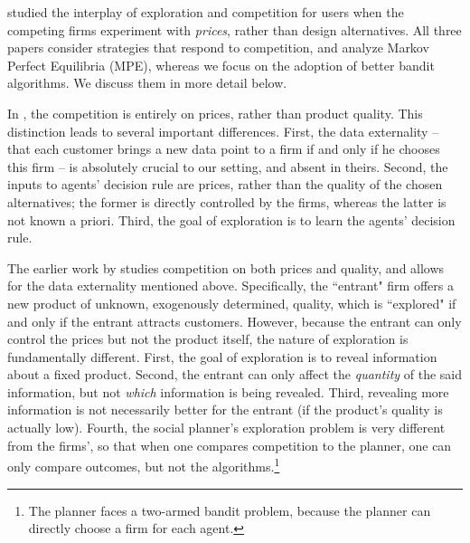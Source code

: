 \citet{bergemann1997market,bergemann2000experimentation,keller2003price} studied the interplay of exploration and competition for users when the competing firms experiment with \emph{prices}, rather than design alternatives. All three papers consider strategies that respond to competition, and analyze Markov Perfect Equilibria (MPE), whereas we focus on the adoption of better bandit algorithms. We discuss them in more detail below.

In \citet{keller2003price}, the competition is entirely on prices, rather than product quality. This distinction leads to several important differences. First, the data externality -- that each customer brings a new data point to a firm if and only if he chooses this firm -- is absolutely crucial to our setting, and absent in theirs. Second, the inputs to agents' decision rule are prices, rather than the quality of the chosen alternatives; the former is directly controlled by the firms, whereas the latter is not known a priori. Third, the goal of exploration is to learn the agents' decision rule.

The earlier work by \citet{bergemann1997market,bergemann2000experimentation} studies competition on both prices and quality, and allows for the data externality mentioned above. Specifically, the ``entrant" firm offers a new product of unknown, exogenously determined, quality, which is ``explored" if and only if the entrant attracts customers. However, because the entrant can only control the prices but not the product itself, the nature of exploration is fundamentally different. First, the goal of exploration is to reveal information about a fixed product. Second, the entrant can only affect the \emph{quantity} of the said information, but not \emph{which} information is being revealed. Third, revealing more information is not necessarily better for the entrant (if the product's quality is actually low). Fourth, the social planner's exploration problem is very different from the firms', so that when one compares competition to the planner, one can only compare outcomes, but not the algorithms.\footnote{The planner faces a two-armed bandit problem, because the planner can directly choose a firm for each agent.}




